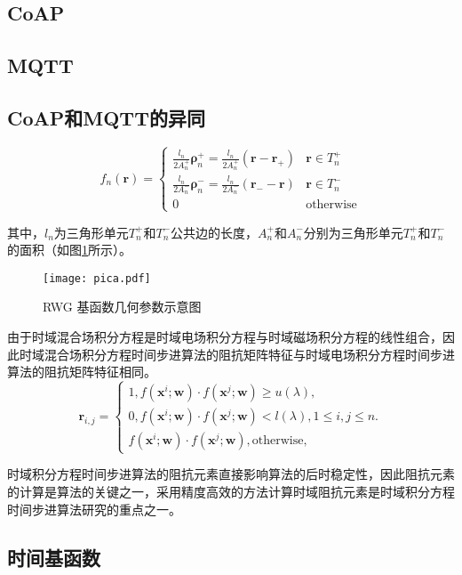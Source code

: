 \subsection{CoAP}

\subsection{MQTT}

\subsection{CoAP和MQTT的异同}

\begin{equation}
f_n(\bm{r})=
\begin{cases}
\frac{l_n}{2A_n^+}\bm{\rho}_n^+=\frac{l_n}{2A_n^+}(\bm{r}-\bm{r}_+)&\bm{r}\in T_n^+\\
\frac{l_n}{2A_n^-}\bm{\rho}_n^-=\frac{l_n}{2A_n^-}(\bm{r}_--\bm{r})&\bm{r}\in T_n^-\\
0&\text{otherwise}
\end{cases}
\end{equation}

其中，$l_n$为三角形单元$T_n^+$和$T_n^-$公共边的长度，$A_n^+$和$A_n^-$分别为三角形单元$T_n^+$和$T_n^-$的面积（如图\ref{pica}所示）。

\begin{figure}[h]
	\texttt{[image: pica.pdf]}
	\caption{RWG 基函数几何参数示意图}
	\label{pica}
\end{figure}

由于时域混合场积分方程是时域电场积分方程与时域磁场积分方程的线性组合，因此时域混合场积分方程时间步进算法的阻抗矩阵特征与时域电场积分方程时间步进算法的阻抗矩阵特征相同。
\begin{equation}
\label{latent_binary_variable}
\bm{r}_{i,j}=
\begin{cases}
1,f(\bm{x}^{i};\bm{w})\cdot f(\bm{x}^{j};\bm{w})\geq u(\lambda),\\
0,f(\bm{x}^{i};\bm{w})\cdot f(\bm{x}^{j};\bm{w})< l(\lambda), 1\leq i,j\leq n.\\
f(\bm{x}^{i};\bm{w})\cdot f(\bm{x}^{j};\bm{w}),\text{otherwise},
\end{cases}
\end{equation}

时域积分方程时间步进算法的阻抗元素直接影响算法的后时稳定性，因此阻抗元素的计算是算法的关键之一，采用精度高效的方法计算时域阻抗元素是时域积分方程时间步进算法研究的重点之一。


\subsection{时间基函数}


